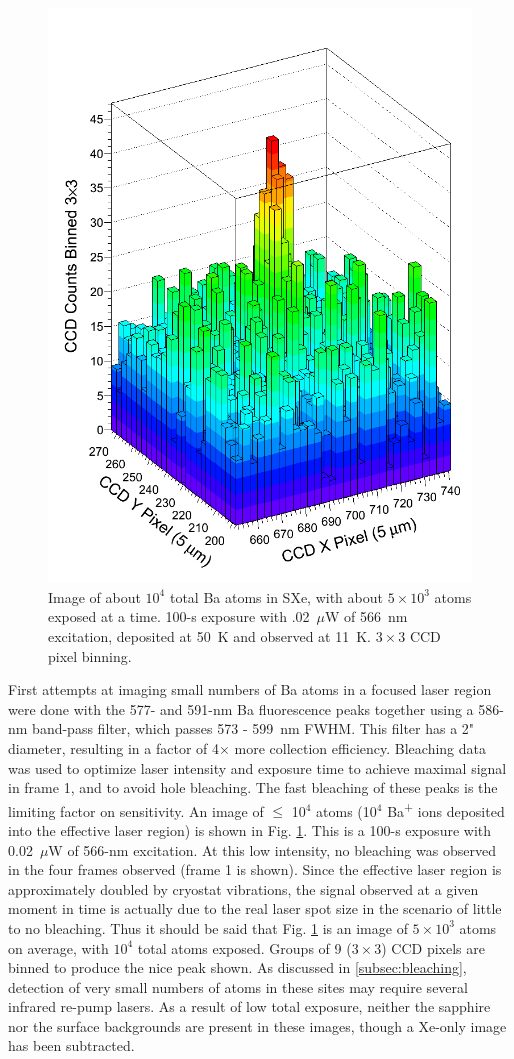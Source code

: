 \begin{figure} %
        \centering
                \includegraphics[width=.6\textwidth]{figures/image_1e4.png}
                \caption{Image of about $10^{4}$ total Ba atoms in SXe, with about $5 \times 10^{3}$ atoms exposed at a time.  100-s exposure with .02~$\mu$W of 566~nm excitation, deposited at 50~K and observed at 11~K.  $3 \times 3$ CCD pixel binning.}
\label{fig:image590s}
\end{figure}

First attempts at imaging small numbers of Ba atoms in a focused laser region were done with the 577- and 591-nm Ba fluorescence peaks together using a 586-nm band-pass filter, which passes 573 - 599~nm FWHM.  This filter has a 2" diameter, resulting in a factor of 4$\times$ more collection efficiency.  Bleaching data was used to optimize laser intensity and exposure time to achieve maximal signal in frame 1, and to avoid hole bleaching.  The fast bleaching of these peaks is the limiting factor on sensitivity.  An image of $\leq$ 10$^{4}$ atoms (10$^{4}$ Ba\textsuperscript{+} ions deposited into the effective laser region) is shown in Fig. \ref{fig:image590s}.  This is a 100-s exposure with 0.02~$\mu$W of 566-nm excitation.  At this low intensity, no bleaching was observed in the four frames observed (frame 1 is shown).  Since the effective laser region is approximately doubled by cryostat vibrations, the signal observed at a given moment in time is actually due to the real laser spot size in the scenario of little to no bleaching.  Thus it should be said that Fig. \ref{fig:image590s} is an image of $5 \times 10^{3}$ atoms on average, with $10^{4}$ total atoms exposed.  Groups of 9 ($3 \times 3$) CCD pixels are binned to produce the nice peak shown.  As discussed in \ref{subsec:bleaching}, detection of very small numbers of atoms in these sites may require several infrared re-pump lasers.  As a result of low total exposure, neither the sapphire nor the surface backgrounds are present in these images, though a Xe-only image has been subtracted. 

